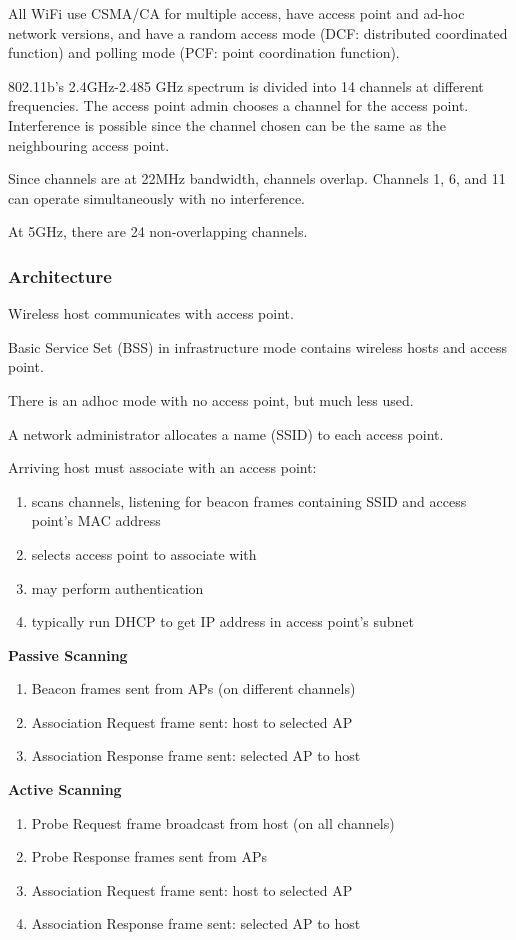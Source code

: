 \documentclass[11pt]{article}
\begin{document}
All WiFi use CSMA/CA for multiple access, have access point and ad-hoc network versions, and have
a random access mode (DCF: distributed coordinated function) and polling mode (PCF: point coordination
function).

802.11b's 2.4GHz-2.485 GHz spectrum is divided into 14 channels at different frequencies.
The access point admin chooses a channel for the access point.
Interference is possible since the channel chosen can be the same as the neighbouring access point.

Since channels are at 22MHz bandwidth, channels overlap.
Channels 1, 6, and 11 can operate simultaneously with no interference.

At 5GHz, there are 24 non-overlapping channels.
\subsubsection{Architecture}
\label{sec:org8cc3d4e}
Wireless host communicates with access point.

Basic Service Set (BSS) in infrastructure mode contains wireless hosts and access point.

There is an adhoc mode with no access point, but much less used.

A network administrator allocates a name (SSID) to each access point.

Arriving host must associate with an access point:
\begin{enumerate}
\item scans channels, listening for beacon frames containing SSID and access point's MAC address
\item selects access point to associate with
\item may perform authentication
\item typically run DHCP to get IP address in access point's subnet
\end{enumerate}

\textbf{Passive Scanning}
\begin{enumerate}
\item Beacon frames sent from APs (on different channels)
\item Association Request frame sent: host to selected AP
\item Association Response frame sent: selected AP to host
\end{enumerate}

\textbf{Active Scanning}
\begin{enumerate}
\item Probe Request frame broadcast from host (on all channels)
\item Probe Response frames sent from APs
\item Association Request frame sent: host to selected AP
\item Association Response frame sent: selected AP to host
\end{enumerate}
\end{document}
